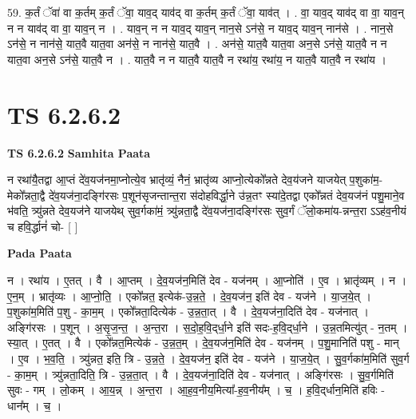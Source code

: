 \documentclass[17pt]{extarticle}
\begin{document}
59. क॒र्तं ॅवा॑ वा क॒र्तम् क॒र्तं ॅवा॒ याव॒द् याव॑द् वा क॒र्तम् क॒र्तं ॅवा॒ याव॑त् । . वा॒ याव॒द् याव॑द् वा वा॒ याव॒न् न न याव॑द् वा वा॒ याव॒न् न । . याव॒न् न न याव॒द् याव॒न् नान॒से ऽन॑से॒ न याव॒द् याव॒न् नान॑से । . नान॒से ऽन॑से॒ न नान॑से॒ यात॒वै यात॒वा अन॑से॒ न नान॑से॒ यात॒वै । . अन॑से॒ यात॒वै यात॒वा अन॒से ऽन॑से॒ यात॒वै न न यात॒वा अन॒से ऽन॑से॒ यात॒वै न । . यात॒वै न न यात॒वै यात॒वै न रथा॑य॒ रथा॑य॒ न यात॒वै यात॒वै न रथा॑य । \newline
\pagebreak
{}

\section{ TS 6.2.6.2 }

\textbf{TS 6.2.6.2 } \newline
\textbf{Samhita Paata} \newline

न रथा॑यै॒तद्वा आ॒प्तं दे॑व॒यज॑नमा॒प्नोत्ये॒व भ्रातृ॑व्यं॒ नैनं॒ भ्रातृ॑व्य आप्नो॒त्येको᳚न्नते देव॒य॑जने याजयेत् प॒शुका॑म॒-मेको᳚न्नता॒द्वै दे॑व॒यज॑ना॒दङ्गि॑रसः प॒शून॑सृजन्तान्त॒रा स॑दोहविर्द्धा॒ने उ॑न्न॒तꣳ स्या॑दे॒तद्वा एको᳚न्नतं देव॒यज॑नं पशु॒माने॒व भ॑वति॒ त्र्यु॑न्नते देव॒यज॑ने याजयेथ् सुव॒र्गका॑मं॒ त्र्यु॑न्नता॒द्वै दे॑व॒यज॑ना॒दङ्गि॑रसः सुव॒र्गं ॅलो॒कमा॑य-न्नन्त॒रा ऽऽह॑व॒नीयं च हवि॒र्द्धानं॑ चो- [  ] \newline

\textbf{Pada Paata} \newline

न । रथा॑य । ए॒तत् । वै । आ॒प्तम् । दे॒व॒यज॑न॒मिति॑ देव - यज॑नम् । आ॒प्नोति॑ । ए॒व । भ्रातृ॑व्यम् । न । ए॒न॒म् । भ्रातृ॑व्यः । आ॒प्नो॒ति॒ । एको᳚न्नत॒ इत्येक॑-उ॒न्न॒ते॒ । दे॒व॒यज॑न॒ इति॑ देव - यज॑ने । या॒ज॒ये॒त् । प॒शुका॑म॒मिति॑ प॒शु - का॒म॒म् । एको᳚न्नता॒दित्येक॑ - उ॒न्न॒ता॒त् । वै । दे॒व॒यज॑ना॒दिति॑ देव - यज॑नात् । अङ्गि॑रसः । प॒शून् । अ॒सृ॒ज॒न्त॒ । अ॒न्त॒रा । स॒दो॒ह॒वि॒द्‌र्धा॒ने इति॑ सदः-ह॒वि॒द्‌र्धा॒ने । उ॒न्न॒तमित्यु॑त् - न॒तम् । स्या॒त् । ए॒तत् । वै । एको᳚न्नत॒मित्येक॑ - उ॒न्न॒त॒म् । दे॒व॒यज॑न॒मिति॑ देव - यज॑नम् । प॒शु॒मानिति॑ पशु - मान् । ए॒व । भ॒व॒ति॒ । त्र्यु॑न्नत॒ इति॒ त्रि - उ॒न्न॒ते॒ । दे॒व॒यज॑न॒ इति॑ देव - यज॑ने । या॒ज॒ये॒त् । सु॒व॒र्गका॑म॒मिति॑ सुव॒र्ग - का॒म॒म् । त्र्यु॑न्नता॒दिति॒ त्रि - उ॒न्न॒ता॒त् । वै । दे॒व॒यज॑ना॒दिति॑ देव - यज॑नात् । अङ्गि॑रसः । सु॒व॒र्गमिति॑ सुवः - गम् । लो॒कम् । आ॒य॒न्न् । अ॒न्त॒रा । आ॒ह॒व॒नीय॒मित्या᳚-ह॒व॒नीय᳚म् । च॒ । ह॒वि॒द्‌र्धान॒मिति॑ हविः - धान᳚म् । च॒ ।  \newline
\end{document}
